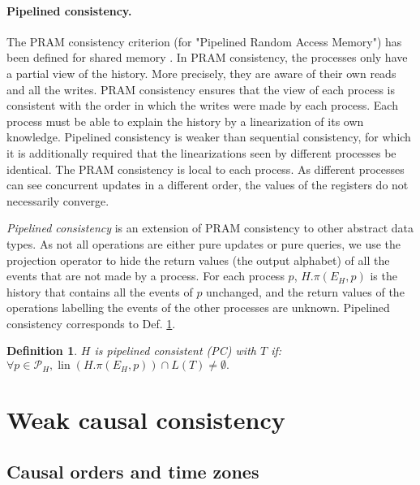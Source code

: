 \documentclass[9pt,numbers]{sigplanconf}
\newtheorem{definition}{Definition}
\DeclareMathOperator{\lin}{lin}
\begin{document}
\paragraph{Pipelined consistency.} The PRAM consistency criterion (for "Pipelined Random Access Memory") 
has been defined for shared memory \cite{lipton1988pram}. In PRAM consistency, the processes only have 
a partial view of the history.
More precisely, they are aware of their own reads and all the writes. PRAM consistency ensures that
the view of each process is consistent with the order in which the writes were made by each process.
Each process must be able to explain the history by a linearization of its own knowledge. 
Pipelined consistency is weaker than sequential consistency, for
which it is additionally required that the linearizations seen by different processes be identical.
The PRAM consistency is local to each process. As different processes can see concurrent 
updates in a different order, the values of the registers do not necessarily converge.

\emph{Pipelined consistency} is an extension of PRAM consistency to other abstract data types. 
As not all operations are either pure updates or pure queries, we use the projection operator to 
hide the return values (the output alphabet) of all the events that are not made by a process.
For each process $p$, $H.\pi(E_H, p)$ is the history that contains all the events of $p$ unchanged,
and the return values of the operations labelling the events of the other processes are unknown.
Pipelined consistency corresponds to Def. \ref{def:PC}. 

\begin{definition}
  \label{def:PC}
  $H$ is \emph{pipelined consistent} (PC) with $T$ if:\linebreak
  $\forall p\in \mathscr{P}_H, \lin\left(H.\pi(E_H, p)\right) \cap L(T) \neq \emptyset.$
\end{definition}

\section{Weak causal consistency}\label{section:weak_causal_consistency}


\subsection{Causal orders and time zones}
\end{document}
